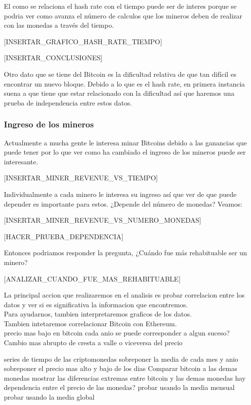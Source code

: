 \documentclass[12pt,letterpaper]{article}
\begin{document}
    El como se relaciona el hash rate con el tiempo puede ser de interes porque se podria ver como avanza el número de calculos que los mineros deben de realizar con las monedas a través del tiempo.

    [INSERTAR_GRAFICO_HASH_RATE_TIEMPO]

    [INSERTAR_CONCLUSIONES]

   Otro dato que se tiene del Bitcoin es la dificultad relativa de que tan difícil es encontrar un nuevo bloque. Debido a lo que es el hash rate, en primera instancia suena a que tiene que estar relacionado con la dificultad así que haremos una prueba de independencia entre estos datos. 

   \subsubsection*{Ingreso de los mineros}

    Actualmente a mucha gente le interesa minar Bitcoins debido a las ganancias que puede tener por lo que ver como ha cambiado el ingreso de los mineros puede ser interesante.

    [INSERTAR_MINER_REVENUE_VS_TIEMPO]

    Individualmente a cada minero le interesa su ingreso así que ver de que puede depender es importante para estos. ¿Depende del número de monedas? Veamos:

    [INSERTAR_MINER_REVENUE_VS_NUMERO_MONEDAS]

    [HACER_PRUEBA_DEPENDENCIA]
    
    Entonces podriamos responder la pregunta, ¿Cuándo fue más rehabituable ser un minero?

    [ANALIZAR_CUANDO_FUE_MAS_REHABITUABLE]







    La principal accion que realizaremos en el analisis es probar correlacion entre los datos y ver si es significativa la informacion que encontremos.
    \\
    Para ayudarnos, tambien interpretaremos graficos de los datos.
    \\
    Tambien intetaremos correlacionar Bitcoin con Ethereum.
    \\
    precio mas bajo en bitcoin cada anio
        se puede corresponder a algun suceso?
    Cambio mas abrupto de cresta a valle o viceversa del precio

    series de tiempo de las criptomonedas
        sobreponer la media de cada mes y anio
    sobreponer el precio mas alto y bajo de los dias
    Comparar bitcoin a las demas monedas
        mostrar las diferencias extremas entre bitcoin y las demas monedas
    hay dependencia entre el precio de las monedas?
        probar usando la media mensual
        probar usando la media global
\end{document}
